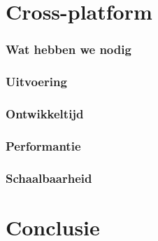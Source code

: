 


\section{Cross-platform}
\subsubsection{Wat hebben we nodig}


\subsubsection{Uitvoering}



\subsubsection{Ontwikkeltijd}



\subsubsection{Performantie}



\subsubsection{Schaalbaarheid}




\section{Conclusie}






















